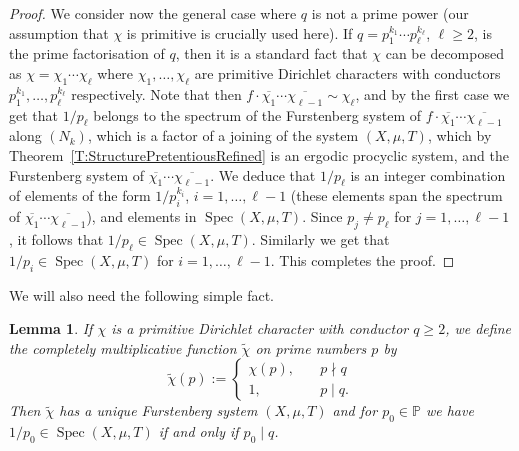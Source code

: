 \documentclass[11pt]{amsart}
\newtheorem{lemma}{Lemma}[section]
\theoremstyle{definition}
\newcommand{\N}{{\mathbb N}}
\renewcommand{\P}{{\mathbb P}}
\DeclareMathOperator{\spec}{Spec}
\begin{document}
\begin{proof}
  We consider now the general case where $q$ is not a prime power (our assumption that $\chi$ is primitive is crucially used here). If $q=p_1^{k_1}\cdots p_\ell^{k_\ell}$, $\ell\geq 2$,  is the prime factorisation of $q$, then it is a standard fact that $\chi$ can be decomposed as $\chi=\chi_1\cdots \chi_\ell$ where $\chi_1,\ldots, \chi_\ell$ are primitive Dirichlet characters with conductors $p_1^{k_1},\ldots, p_\ell^{k_\ell}$ respectively. Note that then $f\cdot \overline{\chi_1}\cdots \overline{\chi_{\ell-1}}\sim \chi_\ell$, and by the first case we get that $1/p_\ell$ belongs to the spectrum of the Furstenberg system of  $f\cdot \overline{\chi_1}\cdots \overline{\chi_{\ell-1}}$ along $(N_k)$, which is a factor of a  joining of the system $(X,\mu,T)$, which by Theorem~\ref{T:StructurePretentiousRefined} is an ergodic procyclic system, and the Furstenberg system of $\overline{\chi_1}\cdots \overline{\chi_{\ell-1}}$. We deduce that $1/p_\ell$ is an integer combination of elements of the form $1/p_i^{k_i}$, $i=1,\ldots, \ell-1$ (these elements span the spectrum of  $\overline{\chi_1}\cdots \overline{\chi_{\ell-1}}$), and elements in 
  $\spec(X,\mu,T)$. Since $p_j\neq p_\ell$ for $j=1,\ldots, \ell-1$, it follows that  $1/p_\ell\in \spec(X,\mu,T)$. Similarly we get that  $1/p_i\in \spec(X,\mu,T)$ for $i=1,\ldots,\ell-1$. This completes the proof. 
\end{proof} 
We will also need the following simple fact. 
\begin{lemma}\label{L:chimodified}
If  $\chi$ is a primitive Dirichlet character with conductor $q\geq 2$,
we define the completely multiplicative function $\tilde{\chi}$  on prime numbers $p$ by
$$
\tilde{\chi}(p):=\begin{cases}
	\chi(p), \quad & p\nmid q \\
	1, \quad & p\mid q.
\end{cases} 
$$
Then $\tilde{\chi}$ has a unique Furstenberg system  $(X,\mu,T)$ and  for $p_0\in \P$ we have $1/p_0 \in \spec(X,\mu,T)$   if and only if   $p_0\mid q$. 
\end{lemma}
\end{document}
